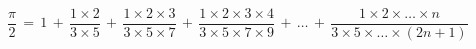 \documentclass{article}
\begin{document}
$\dfrac{\pi}{2}\,=\,1\,+\,\dfrac{1\times2}{3\times5}\,+\,\dfrac{1\times2\times3}{3\times5\times7}\,+\,\dfrac{1\times2\times3\times4}{3\times5\times7\times9}\,+\,\ldots\,+\,\dfrac{1\times2\times\ldots\times n}{3\times5\times\ldots\times\left(2n+1\right)}$
\end{document}
